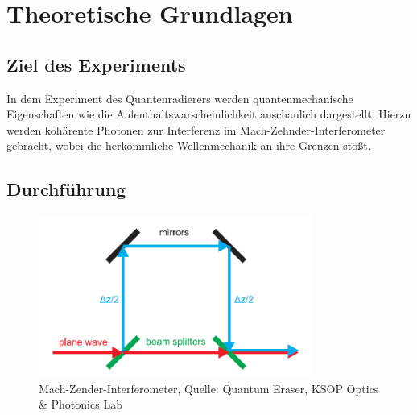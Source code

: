 \documentclass{include/thesisclass3}
\begin{document}
	\FrontMatter
	
	\tableofcontents                  
	\newpage
	\MainMatter


\chapter{Theoretische Grundlagen}

\section{Ziel des Experiments}

In dem Experiment des Quantenradierers werden quantenmechanische Eigenschaften wie die Aufenthaltswarscheinlichkeit anschaulich dargestellt. Hierzu werden kohärente Photonen zur Interferenz im Mach-Zehnder-Interferometer gebracht, wobei die herkömmliche Wellenmechanik an ihre Grenzen stößt. 

\section{Durchführung}
\begin{figure}[H]
	\begin{center}
		\includegraphics[width=0.8\textwidth]{images/Beamsplit.png}
		\caption{Mach-Zender-Interferometer, Quelle: Quantum Eraser, KSOP Optics \& Photonics Lab}
		\label{Mach-Zehnder}
	\end{center}
\end{figure}
\end{document}
